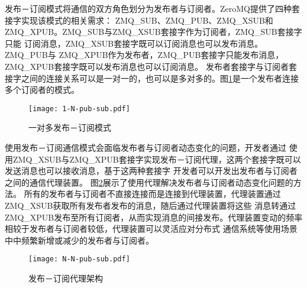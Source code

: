 发布－订阅模式将通信的双方角色划分为发布者与订阅者。ZeroMQ提供了四种套接字实现该模式的相关需求：
ZMQ\_SUB、ZMQ\_PUB、ZMQ\_XSUB和ZMQ\_XPUB。ZMQ\_SUB与ZMQ\_XSUB套接字作为订阅者，ZMQ\_SUB套接字只能
订阅消息，ZMQ\_XSUB套接字既可以订阅消息也可以发布消息。ZMQ\_PUB与
ZMQ\_XPUB作为发布者，ZMQ\_PUB套接字只能发布消息，ZMQ\_XPUB套接字既可以发布消息也可以订阅消息。
发布者套接字与订阅者套接字之间的连接关系可以是一对一的，也可以是多对多的。图\ref{1-N-pub-sub}是一个发布者连接多个订阅者的模式。
\begin{figure}[H]
  \centering
  \texttt{[image: 1-N-pub-sub.pdf]}
  \caption{一对多发布－订阅模式}
  \label{1-N-pub-sub}
\end{figure}

使用发布－订阅通信模式会面临发布者与订阅者动态变化的问题，开发者通过
使用ZMQ\_XSUB与ZMQ\_XPUB套接字实现发布－订阅代理，这两个套接字既可以发送消息也可以接收消息，基于这两种套接字
开发者可以开发出发布者与订阅者之间的通信代理装置。
图\ref{N-N-pub-sub}展示了使用代理解决发布者与订阅者动态变化问题的方法。
所有的发布者与订阅者不直接连接而是连接到代理装置，代理装置通过ZMQ\_XSUB获取所有发布者发布的消息，随后通过代理装置将这些
消息转通过ZMQ\_XPUB发布至所有订阅者，从而实现消息的间接发布。代理装置变动的频率相较于发布者与订阅者较低，代理装置可以灵活应对分布式
通信系统等使用场景中中频繁新增或减少的发布者与订阅者。
\begin{figure}[H]
  \centering
  \texttt{[image: N-N-pub-sub.pdf]}
  \caption{发布－订阅代理架构}
  \label{N-N-pub-sub}
\end{figure}

